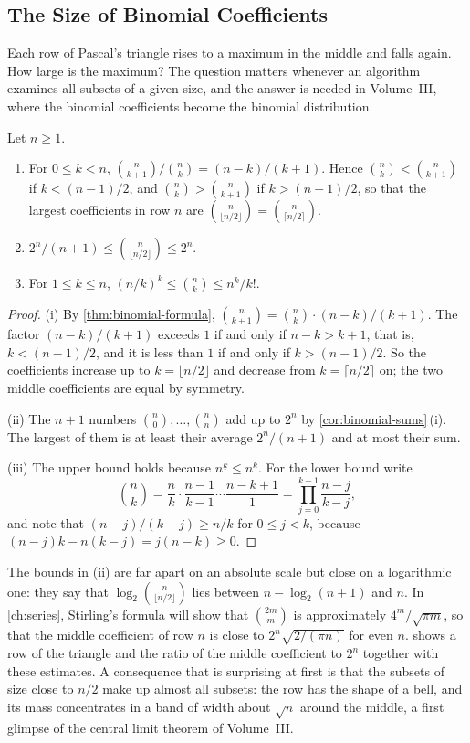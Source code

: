 \subsection{The Size of Binomial Coefficients}

Each row of Pascal's triangle rises to a maximum in the middle and falls again. How large is the maximum? The question matters whenever an algorithm examines all subsets of a given size, and the answer is needed in Volume~III, where the binomial coefficients become the binomial distribution.

\begin{proposition}
\label{prop:binomial-size}
Let $n\ge1$.
\begin{enumerate}
\item For $0\le k<n$, $\binom n{k+1}\big/\binom nk=(n-k)/(k+1)$. Hence $\binom nk<\binom n{k+1}$ if $k<(n-1)/2$, and $\binom nk>\binom n{k+1}$ if $k>(n-1)/2$, so that the largest coefficients in row $n$ are $\binom n{\lfloor n/2\rfloor}=\binom n{\lceil n/2\rceil}$.
\item $2^n/(n+1)\le\binom n{\lfloor n/2\rfloor}\le2^n$.
\item For $1\le k\le n$, $(n/k)^k\le\binom nk\le n^k/k!$.
\end{enumerate}
\end{proposition}

\begin{proof}
(i) By \cref{thm:binomial-formula}, $\binom n{k+1}=\binom nk\cdot(n-k)/(k+1)$. The factor $(n-k)/(k+1)$ exceeds $1$ if and only if $n-k>k+1$, that is, $k<(n-1)/2$, and it is less than $1$ if and only if $k>(n-1)/2$. So the coefficients increase up to $k=\lfloor n/2\rfloor$ and decrease from $k=\lceil n/2\rceil$ on; the two middle coefficients are equal by symmetry.

(ii) The $n+1$ numbers $\binom n0,\ldots,\binom nn$ add up to $2^n$ by \cref{cor:binomial-sums}\,(i). The largest of them is at least their average $2^n/(n+1)$ and at most their sum.

(iii) The upper bound holds because $n^{\underline k}\le n^k$. For the lower bound write
\[
\binom nk=\frac{n}{k}\cdot\frac{n-1}{k-1}\cdots\frac{n-k+1}{1}=\prod_{j=0}^{k-1}\frac{n-j}{k-j},
\]
and note that $(n-j)/(k-j)\ge n/k$ for $0\le j<k$, because $(n-j)k-n(k-j)=j(n-k)\ge0$.
\end{proof}

The bounds in (ii) are far apart on an absolute scale but close on a logarithmic one: they say that $\log_2\binom n{\lfloor n/2\rfloor}$ lies between $n-\log_2(n+1)$ and $n$. In \cref{ch:series}, Stirling's formula will show that $\binom{2m}{m}$ is approximately $4^m/\sqrt{\pi m}$, so that the middle coefficient of row $n$ is close to $2^n\sqrt{2/(\pi n)}$ for even $n$.  shows a row of the triangle and the ratio of the middle coefficient to $2^n$ together with these estimates. A consequence that is surprising at first is that the subsets of size close to $n/2$ make up almost all subsets: the row has the shape of a bell, and its mass concentrates in a band of width about $\sqrt n$ around the middle, a first glimpse of the central limit theorem of Volume~III.

